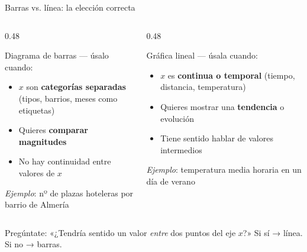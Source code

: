 \documentclass[aspectratio=169, 10pt, spanish]{beamer}
\begin{document}
\begin{frame}{Barras vs. línea: la elección correcta}
  \begin{columns}[T]
    \begin{column}{0.48\textwidth}
      \begin{definicionbox}{Diagrama de barras — úsalo cuando:}
        \AlmFontSmall
        \begin{itemize}
          \item $x$ son \textbf{categorías separadas}\\
                (tipos, barrios, meses como etiquetas)
          \item Quieres \textbf{comparar magnitudes}
          \item No hay continuidad entre valores de $x$
        \end{itemize}
        \vspace{4pt}
        \textit{Ejemplo}: nº de plazas hoteleras por barrio de Almería
      \end{definicionbox}
    \end{column}
    \begin{column}{0.48\textwidth}
      \begin{definicionbox}{Gráfica lineal — úsala cuando:}
        \AlmFontSmall
        \begin{itemize}
          \item $x$ es \textbf{continua o temporal}
                (tiempo, distancia, temperatura)
          \item Quieres mostrar una \textbf{tendencia} o evolución
          \item Tiene sentido hablar de valores intermedios
        \end{itemize}
        \vspace{4pt}
        \textit{Ejemplo}: temperatura media horaria en un día de verano
      \end{definicionbox}
    \end{column}
  \end{columns}

  \vspace{0.3cm}
  \begin{notabox}
    \AlmFontSmall
    Pregúntate: «¿Tendría sentido un valor \textit{entre} dos puntos del eje $x$?»
    Si sí → línea. Si no → barras.
  \end{notabox}
\end{frame}
\end{document}
